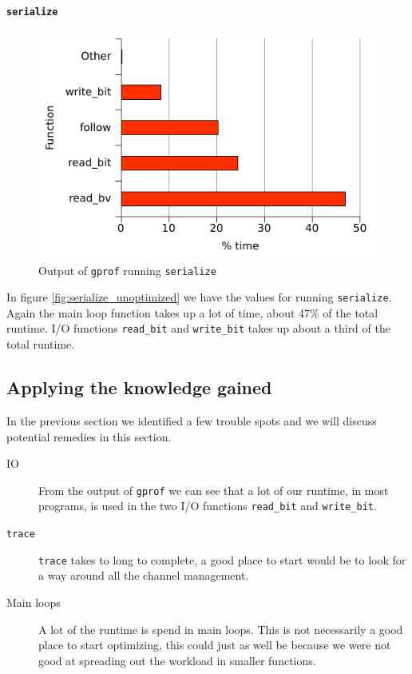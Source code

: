 \paragraph{\texttt{serialize}}
\begin{figure}
  \centering
  \includegraphics{optimizations/serialize_unoptimized.pdf}
  \caption{Output of \texttt{gprof} running \texttt{serialize}}
  \label{fig:serialize_unoptimized}
\end{figure}
In figure \vref{fig:serialize_unoptimized} we have the values for
running \texttt{serialize}. Again the main loop function takes up a
lot of time, about 47\% of the total runtime. I/O functions
\lstinline{read_bit} and \lstinline{write_bit} takes up about a third
of the total runtime.

\subsection{Applying the knowledge gained}

In the previous section we identified a few trouble spots and we will discuss potential remedies in this section. 
\begin{description}
\item[IO] From the output of \texttt{gprof} we can see that a lot of
  our runtime, in most programs, is used in the two I/O functions
  \lstinline{read_bit} and \lstinline{write_bit}.
\item[\texttt{trace}] \lstinline{trace} takes to long to complete, a
  good place to start would be to look for a way around all the
  channel management.
\item[Main loops] A lot of the runtime is spend in main loops. This is
  not necessarily a good place to start optimizing, this could just as
  well be because we were not good at spreading out the workload in
  smaller functions.
\end{description}


